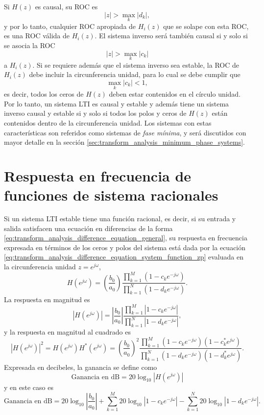 \documentclass[a4paper]{report}
\begin{document}
Si \(H(z)\) es causal, su ROC es
\[
 |z|>\max_k|d_k|,
\]
y por lo tanto, cualquier ROC apropiada de \(H_i(z)\) que se solape con esta ROC, es una ROC válida de \(H_i(z)\). El sistema inverso será también causal si y solo si se asocia la ROC
\[
 |z|>\max_k|c_k|
\]
a \(H_i(z)\). Si se requiere además que el sistema inverso sea estable, la ROC de \(H_i(z)\) debe incluir la circunferencia unidad, para lo cual se debe cumplir que 
\[
 \max_k|c_k|<1,
\]
es decir, todos los ceros de \(H(z)\) deben estar contenidos en el círculo unidad. Por lo tanto, un sistema LTI es causal y estable y además tiene un sistema inverso causal y estable si y solo si todos los polos y ceros de \(H(z)\) están contenidos dentro de la circunferencia unidad. Los sistemas con estas características son referidos como sistemas de \emph{fase mínima}, y será discutidos con mayor detalle en la sección \ref{sec:transform_analysis_minimum_phase_systems}.

\section{Respuesta en frecuencia de funciones de sistema racionales}

Si un sistema LTI estable tiene una función racional, es decir, si su entrada y salida satisfacen una ecuación en diferencias de la forma \ref{eq:transform_analysis_difference_equation_general}, su respuesta en frecuencia expresada en términos de los ceros y polos del sistema está dada por la ecuación \ref{eq:transform_analysis_difference_equation_system_function_zp} evaluada en la circunferencia unidad \(z=e^{j\omega}\),
\[
 H(e^{j\omega})=\left(\frac{b_0}{a_0}\right)\frac{\prod\limits_{k=1}^M(1-c_ke^{-j\omega})}{\prod\limits_{k=1}^N(1-d_ke^{-j\omega})}. 
\]
La respuesta en magnitud es
\[
 |H(e^{j\omega})|=\left|\frac{b_0}{a_0}\right|\frac{\prod\limits_{k=1}^M|1-c_ke^{-j\omega}|}{\prod\limits_{k=1}^N|1-d_ke^{-j\omega}|},
\]
y la respuesta en magnitud al cuadrado es 
\[
 |H(e^{j\omega})|^2=H(e^{j\omega})H^*(e^{j\omega})=\left(\frac{b_0}{a_0}\right)^2\frac{\prod\limits_{k=1}^M(1-c_ke^{-j\omega})(1-c^*_ke^{j\omega})}{\prod\limits_{k=1}^N(1-d_ke^{-j\omega})(1-d^*_ke^{j\omega})}. 
\]
Expresada en decibeles, la ganancia se define como
\[
 \textrm{Ganancia en dB}=20\log_{10}|H(e^{j\omega})|
\]
y en este caso es
\begin{equation}\label{eq:transform_analysis_rational_function_magnitude_db}
 \textrm{Ganancia en dB}=20\log_{10}\left|\frac{b_0}{a_0}\right|+\sum_{k=1}^M 20\log_{10}|1-c_ke^{-j\omega}|-\sum_{k=1}^N 20\log_{10}|1-d_ke^{-j\omega}|. 
\end{equation}
\end{document}
